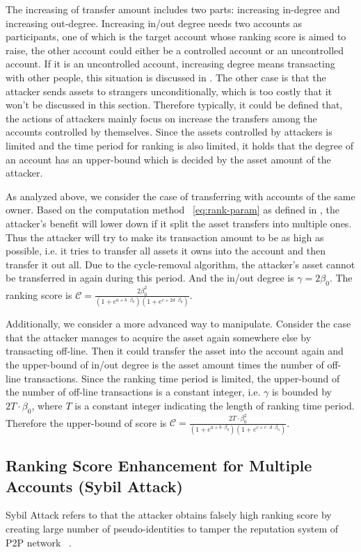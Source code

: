 The increasing of transfer amount includes two parts: increasing in-degree and increasing out-degree. Increasing in/out degree needs two accounts as participants, one of which is the target account whose ranking score is aimed to raise, the other account could either be a controlled account or an  uncontrolled account. If it is an uncontrolled account, increasing degree means transacting with other people, this situation is discussed in . The other case is that the attacker sends assets to strangers unconditionally, which is too costly that it won't be discussed in this section. Therefore typically, it could be defined that, the actions of attackers mainly focus on increase the transfers among the accounts controlled by themselves. Since the assets controlled by attackers is limited and the time period for ranking is also limited, it holds that the degree of an account has an upper-bound which is decided by the asset amount of the attacker.

As analyzed above, we consider the case of transferring with accounts of the same owner. Based on the computation method ~\ref{eq:rank-param} as defined in , the attacker's benefit will lower down if it split the asset transfers into multiple ones. Thus the attacker will try to make its transaction amount to be as high as possible, i.e. it tries to transfer all assets it owns into the account and then transfer it out all. Due to the cycle-removal algorithm, the attacker's asset cannot be transferred in again during this period. And the in/out degree is $\gamma = 2 \beta_0$. The ranking score is $\mathcal{C} =  \frac{2 \beta_0 ^2}{ (1+e^{a + b \cdot \beta_0}) (1+e^{c + 2 d \cdot \beta_0})}$.

Additionally, we consider a more advanced way to manipulate. Consider the case that the attacker manages to acquire the asset again somewhere else by transacting off-line. Then it could transfer the asset into the account again and the upper-bound of in/out degree is the asset amount times the number of off-line transactions. Since the ranking time period is limited, the upper-bound of the number of off-line transactions is a constant integer, i.e. $\gamma$ is bounded by $2T \cdot \beta_0$, where $T$ is a constant integer indicating the length of ranking time period. Therefore the upper-bound of score is $\mathcal{C} =  \frac{2T \cdot \beta_0 ^2}{ (1+e^{a + b \cdot \beta_0}) (1+e^{c + c \cdot d \cdot \beta_0})}$.

\subsection{Ranking Score Enhancement for Multiple Accounts (Sybil Attack)}
Sybil Attack refers to that the attacker obtains falsely high ranking score by creating large number of pseudo-identities to tamper the reputation system of P2P network ~\cite{quercia2010sybil}.

